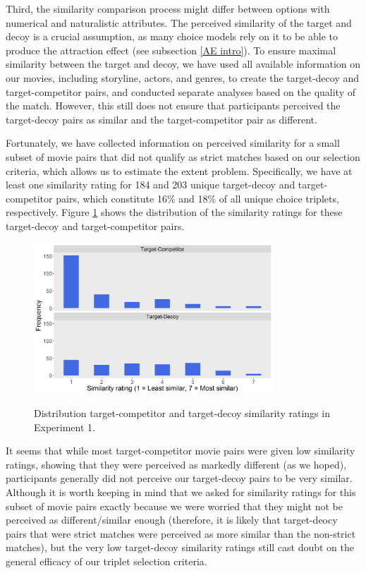 \documentclass[11pt,a4paper]{article}
\begin{document}
Third, the similarity comparison process might differ between options with  numerical and naturalistic attributes. The perceived similarity of the target and decoy is a crucial assumption, as many choice models rely on it to be able to produce the attraction effect (see subsection \ref{AE intro}). To ensure maximal similarity between the target and decoy, we have used all available information on our movies, including storyline, actors, and genres, to create the target-decoy and target-competitor pairs, and conducted separate analyses based on the quality of the match. However, this still does not ensure that participants perceived the target-decoy pairs as similar and the target-competitor pair as different. 



Fortunately, we have collected information on perceived similarity for a small subset of movie pairs that did not qualify as strict matches based on our selection criteria, which allows us to estimate the extent problem. Specifically, we have at least one similarity rating for 184 and 203 unique target-decoy and target-competitor pairs, which constitute 16\% and 18\% of all unique choice triplets, respectively. Figure \ref{fig:exp1_simrat} shows the distribution of the similarity ratings for these target-decoy and target-competitor pairs.



 \begin{figure}[!htb]
 \captionsetup{justification=centering}
\centering
\caption{Distribution target-competitor and target-decoy similarity ratings in Experiment 1.}
\includegraphics[width=0.8\textwidth]{exp1_similarityratings.png}
\label{fig:exp1_simrat}
\end{figure}

It seems that while most target-competitor movie pairs were given low similarity ratings, showing that they were perceived as markedly different (as we hoped), participants generally did not perceive our target-decoy pairs to be very similar. Although it is worth keeping in mind that we asked for similarity ratings for this subset of movie pairs exactly because we were worried that they might not be perceived as different/similar enough (therefore, it is likely that target-deocy pairs that were strict matches were perceived as more similar than the non-strict matches), but the very low target-decoy similarity ratings still cast doubt on the general efficacy of our triplet selection criteria. 
\end{document}
